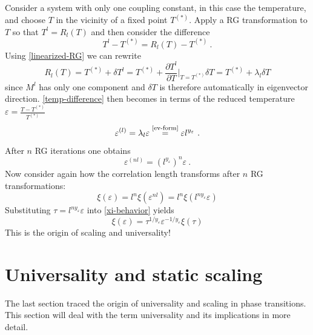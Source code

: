 	Consider a system with only one coupling constant, in this case the temperature, and choose $T$ in the vicinity of a fixed point $T^{(*)}$. Apply a RG transformation to $T$ so that $T^l =	R_l(T)$ and then consider the difference 
	\begin{equation} \label{temp-difference}
		T^l - T^{(*)} =	R_l(T) - T^{(*)}~. 
	\end{equation}
	Using \autoref{linearized-RG} we can rewrite
	\begin{equation}
		R_l(T) =	T^{(*)} + \delta T^l =	T^{(*)} + \frac{\partial T^l}{\partial T} \bigg |_{T =	T^{(*)}} \delta T =	T^{(*)} + \lambda_l \delta T
	\end{equation}
	since $M^l$ has only one component and $\delta T$ is therefore automatically in eigenvector direction. \autoref{temp-difference} then becomes in terms of the reduced temperature $ \varepsilon =	\frac{T - T^{(*)}}{T^{(*)}}$
	\begin{equation} \label{coupling-constant-ev-scaling}
		\varepsilon^{(l)} =	\lambda_l \varepsilon \overset{\text{\autoref{ev-form}}}{=} \varepsilon l^{y_\varepsilon}~.
	\end{equation}
	After $n$ RG iterations one obtains
	\begin{equation}
		\varepsilon^{(nl)} = \left( l^{y_\varepsilon}	\right)^n \varepsilon~.
	\end{equation}
	Now consider again how the correlation length transforms after $n$ RG transformations:
	\begin{equation} \label{xi-behavior}
		\xi(\varepsilon) =	l^n \xi(\varepsilon^{nl}) =	l^n \xi( l^{ny_\varepsilon} \varepsilon)
	\end{equation}
	Substituting $\tau =	l^{ny_\varepsilon} \varepsilon$ into \autoref{xi-behavior} yields
	\begin{equation} \label{Eq::RG-xi-scaling}
		\xi(\varepsilon) =	\tau^{1 / y_\varepsilon} \varepsilon^{-1/ y_\varepsilon} \xi(\tau)
	\end{equation}
	This is the origin of scaling and universality!
	\section{Universality and static scaling} \label{Section::Universality}
	The last section traced the origin of universality and scaling in phase transitions. This section will deal with the term universality and its implications in more detail. \\
	
